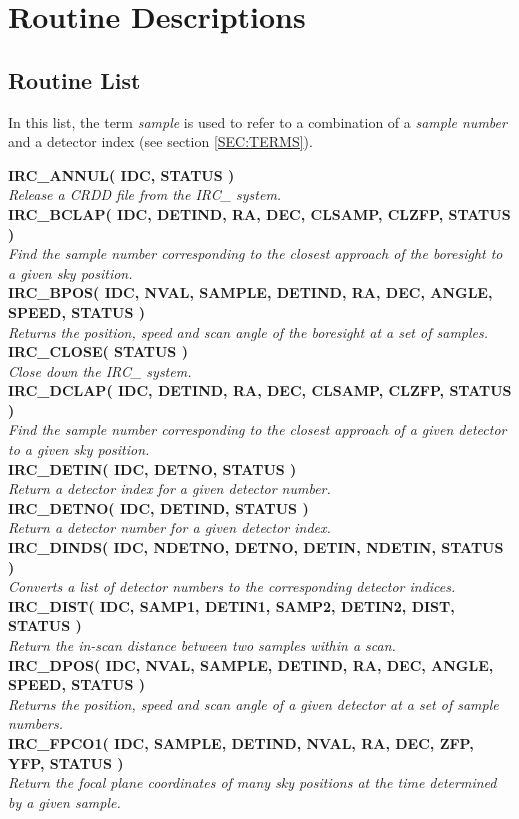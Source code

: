 \appendix
\section {Routine Descriptions}
\label {APP:ROUTS}

\subsection {Routine List}
In this list, the term {\em sample} is used to refer to a combination of a {\em
sample number} and a {detector index} (see section \ref{SEC:TERMS}).

\newcommand{\noteroutine}[2]{{\small \bf #1} \\
                              \hspace*{3em} {\em #2} \\[1.5ex]}
\noteroutine{IRC\_ANNUL( IDC, STATUS )}
   {Release a CRDD file from the IRC\_ system.}
\noteroutine{IRC\_BCLAP( IDC, DETIND, RA, DEC, CLSAMP, CLZFP, STATUS )}
   {Find the sample number corresponding to the closest approach of the 
    boresight to a given sky position.}
\noteroutine{IRC\_BPOS( IDC, NVAL, SAMPLE, DETIND, RA, DEC, ANGLE, SPEED, 
                        STATUS )}
   {Returns the position, speed and scan angle of the boresight at a set of 
    samples.}
\noteroutine{IRC\_CLOSE( STATUS )}
   {Close down the IRC\_ system.}
\noteroutine{IRC\_DCLAP( IDC, DETIND, RA, DEC, CLSAMP, CLZFP, STATUS )}
   {Find the sample number corresponding to the closest approach of a given
    detector to a given sky position.}
\noteroutine{IRC\_DETIN( IDC, DETNO, STATUS )}
   {Return a detector index for a given detector number.}
\noteroutine{IRC\_DETNO( IDC, DETIND, STATUS )}
   {Return a detector number for a given detector index.}
\noteroutine{IRC\_DINDS( IDC, NDETNO, DETNO, DETIN, NDETIN, STATUS )}
   {Converts a list of detector numbers to the corresponding detector indices.}
\noteroutine{IRC\_DIST( IDC, SAMP1, DETIN1, SAMP2, DETIN2, DIST, STATUS )}
   {Return the in-scan distance between two samples within a scan.}
\noteroutine{IRC\_DPOS( IDC, NVAL, SAMPLE, DETIND, RA, DEC, ANGLE, SPEED, 
                        STATUS )}
   {Returns the position, speed and scan angle of a given detector at a set 
    of sample numbers.}
\noteroutine{IRC\_FPCO1( IDC, SAMPLE, DETIND, NVAL, RA, DEC, ZFP, YFP, STATUS )}
   {Return the focal plane coordinates of many sky positions at the time 
    determined by a given sample.}
